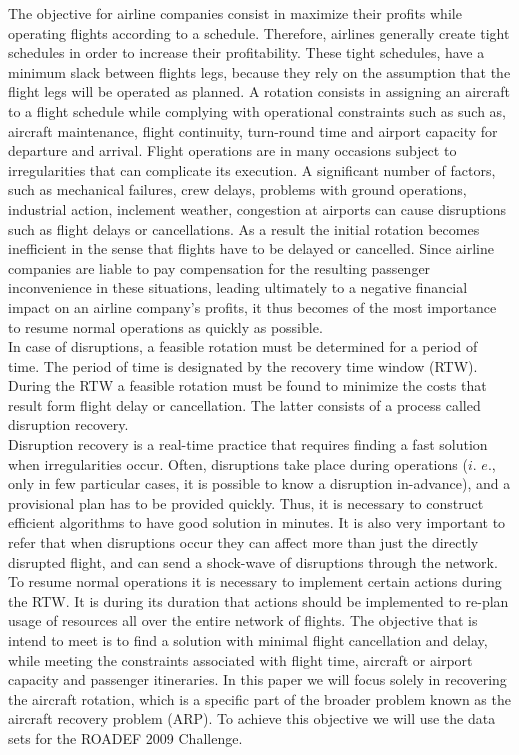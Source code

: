 \documentclass[ijoo,nonblindrev]{informs-ijoo}
\begin{document}
The objective for airline companies consist in maximize their profits while operating flights according to a schedule. Therefore, airlines generally create tight schedules in order to increase their profitability. These tight schedules, have a minimum slack between flights legs, because they rely on the assumption that the flight legs will be operated as planned. A rotation consists in assigning an aircraft to a flight schedule while complying with operational constraints such as such as, aircraft maintenance, flight continuity, turn-round time and airport capacity for departure and arrival.
Flight operations are in many occasions subject to irregularities that can complicate its execution.
A significant number of factors, such as mechanical failures, crew delays, problems with ground operations, industrial action, inclement weather, congestion at airports can cause disruptions such as flight delays or cancellations. As a result the initial rotation becomes inefficient in the sense that flights have to be delayed or cancelled. Since airline companies are liable to pay compensation for the resulting passenger inconvenience in these situations, leading ultimately to a negative financial impact on an airline company’s profits, it thus becomes of the most importance to resume normal operations as quickly as possible.\\
In case of disruptions, a feasible rotation must be determined for a period of time. The period of time is designated by the recovery time window (RTW). During the RTW a feasible rotation must be found to minimize the costs that result form flight delay or cancellation. The latter consists of a process called disruption recovery.\\
Disruption recovery is a real-time practice that requires finding a fast solution when irregularities occur. Often, disruptions take place during operations ($i.$ $e.$, only in few particular cases, it is possible to know a disruption in-advance), and a provisional plan has to be provided quickly. Thus, it is necessary to construct efficient algorithms to have good solution in minutes. It is also very important to refer that when disruptions occur they can affect more than just the directly disrupted flight, and can send a shock-wave of disruptions through the network. To resume normal operations it is necessary to implement certain actions during the RTW. It is during its duration that actions should be implemented to re-plan usage of resources all over the entire network of flights. The objective that is intend to meet is to find a solution with minimal flight cancellation and delay, while meeting the constraints associated with flight time, aircraft or airport capacity and passenger itineraries. In this paper we will focus solely in recovering the aircraft rotation, which is a specific part of the broader problem known as the aircraft recovery problem (ARP). To achieve this objective we will use the  data sets for the ROADEF 2009 Challenge.\\
\end{document}
